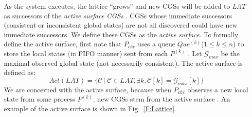 \documentclass[10pt,conference,compsocconf,letterpaper]{IEEEtran}
\begin{document}
\iffalse
To capture runtime evolution of the system state, we are concerned with the \textit{surface CGSs} in the lattice. Informally, surface CGSs are on the boundary of the currently-observed lattice \cite{Yang13}. To formally define the surface, first note that $P_{che}$ uses a queue $Que^{(k)}$($1\leq k \leq n$) to store the local states (in FIFO manner) sent from each $P^{(k)}$ \cite{Garg96, Huang12, Hua10}. Let $LAT$ be the currently-observed lattice, $\mathcal{C}_{max}$ be the maximal CGS, and $\mathcal{G}_{max}$ be the maximal global state (not necessarily consistent). The surface of $LAT$ is defined as $$Surf(LAT) = \{\mathcal{C}~|~\mathcal{C}\in LAT, \exists k, \mathcal{C}[k] = \mathcal{C}_{max}[k]\}$$
\noindent Refer to the geometric illustration in Fig.~\ref{F:Lattice}, the current $\mathcal{C}_{max} = (s^{(1)}_{4}, s^{(2)}_{4})$, $\mathcal{G}_{max} = (s^{(1)}_{5}, s^{(2)}_{4})$, and $Surf(LAT) = \{\mathcal{C}_{24}, \mathcal{C}_{34}, \mathcal{C}_{43}, \mathcal{C}_{44}\}$.
\fi

As the system executes, the lattice ``grows'' and new CGSs will be added to {\it LAT} as successors of the \textit{active surface CGSs} \cite{Yang13}. CGSs whose immediate successors (consistent or inconsistent global states) are not all discovered could have new immediate successors. We define these CGSs as the \textit{active surface}. To formally define the active surface, first note that $P_{che}$ uses a queue $Que^{(k)}$($1\leq k \leq n$) to store the local states (in FIFO manner) sent from each $P^{(k)}$ \cite{Garg96, Huang12, Yang13}. Let $\mathcal{G}_{max}$ be the maximal observed global state (not necessarily consistent). The active surface is defined as:
$$Act(LAT) = \{\mathcal{C}~|~\mathcal{C}\in LAT, \exists k, \mathcal{C}[k] = \mathcal{G}_{max}[k]\}$$
We are concerned with the active surface, because when $P_{che}$ observes a new local state from some process $P^{(k)}$, new CGSs stem from the active surface \cite{Yang13}. An example of the active surface is shown in Fig.~\ref{F:Lattice}.
\end{document}
